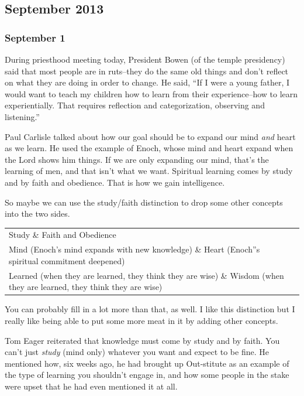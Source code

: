 \subsection{September 2013}

\subsubsection{September 1}

During priesthood meeting today, President Bowen (of the temple presidency) said that most people are in ruts--they do the same old things and don't reflect on what they are doing in order to change. He said, ``If I were a young father, I would want to teach my children how to learn from their experience--how to learn experientially. That requires reflection and categorization, observing and listening.''

Paul Carlisle talked about how our goal should be to expand our mind \textit{and} heart as we learn. He used the example of Enoch, whose mind and heart expand when the Lord shows him things. If we are only expanding our mind, that's the learning of men, and that isn't what we want. Spiritual learning comes by study and by faith and obedience. That is how we gain intelligence.

So maybe we can use the study/faith distinction to drop some other concepts into the two sides.

\begin{table}
\centering
 \begin{tabular}{p{4cm}|p{4cm}}
 Study \& Faith and Obedience \\
 Mind (Enoch's mind expands with new knowledge) \& Heart (Enoch''s spiritual commitment deepened) \\
 Learned (when they are learned, they think they are wise) \& Wisdom (when they are learned, they think they are wise) \\
 \end{tabular}
\end{table}

You can probably fill in a lot more than that, as well. I like this distinction but I really like being able to put some more meat in it by adding other concepts.

Tom Eager reiterated that knowledge must come by study and by faith. You can't just \textit{study} (mind only) whatever you want and expect to be fine. He mentioned how, six weeks ago, he had brought up Out-stitute as an example of the type of learning you shouldn't engage in, and how some people in the stake were upset that he had even mentioned it at all.

